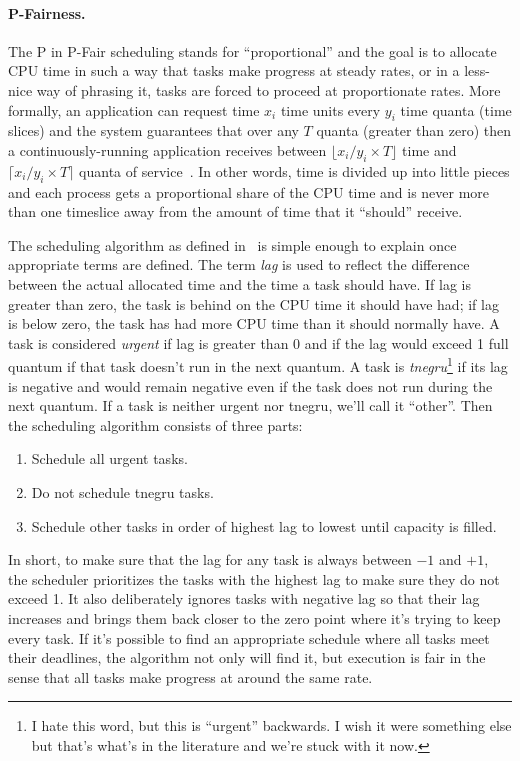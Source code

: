 \paragraph{P-Fairness.}
The P in P-Fair scheduling stands for ``proportional'' and the goal is to allocate CPU time in such a way that tasks make progress at steady rates, or in a less-nice way of phrasing it, tasks are forced to proceed at proportionate rates. More formally, an application can request time $x_i$ time units every $y_i$ time quanta (time slices) and the system guarantees that over any $T$ quanta (greater than zero) then a continuously-running application receives between $\lfloor x_i/y_i \times T\rfloor$ time and $\lceil x_i/y_i \times T\rceil$ quanta of service~\cite{pfair2}. In other words, time is divided up into little pieces and each process gets a proportional share of the CPU time and is never more than one timeslice away from the amount of time that it ``should'' receive.

The scheduling algorithm as defined in~\cite{pfair} is simple enough to explain once appropriate terms are defined. The term \textit{lag} is used to reflect the difference between the actual allocated time and the time a task should have. If lag is greater than zero, the task is behind on the CPU time it should have had; if lag is below zero, the task has had more CPU time than it should normally have.  A task is considered \textit{urgent} if lag is greater than 0 and if the lag would exceed 1 full quantum if that task doesn't run in the next quantum. A task is \textit{tnegru}\footnote{I hate this word, but this is ``urgent'' backwards. I wish it were something else but that's what's in the literature and we're stuck with it now.} if its lag is negative and would remain negative even if the task does not run during the next quantum. If a task is neither urgent nor tnegru, we'll call it ``other''. Then the scheduling algorithm consists of three parts:
\begin{enumerate}
	\item Schedule all urgent tasks.
	\item Do not schedule tnegru tasks.
	\item Schedule other tasks in order of highest lag to lowest until capacity is filled.
\end{enumerate}

In short, to make sure that the lag for any task is always between $-1$ and $+1$, the scheduler prioritizes the tasks with the highest lag to make sure they do not exceed 1. It also deliberately ignores tasks with negative lag so that their lag increases and brings them back closer to the zero point where it's trying to keep every task. If it's possible to find an appropriate schedule where all tasks meet their deadlines, the algorithm not only will find it, but execution is fair in the sense that all tasks make progress at around the same rate.

